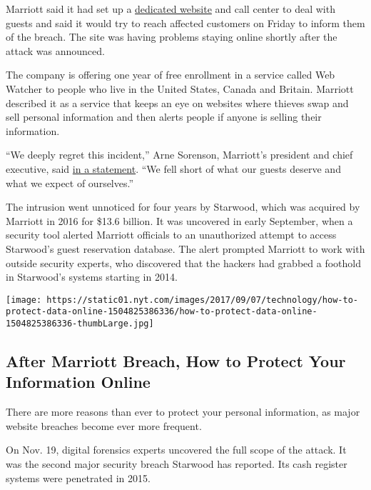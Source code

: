 Marriott said it had set up a
\href{https://info.starwoodhotels.com/}{dedicated website} and call
center to deal with guests and said it would try to reach affected
customers on Friday to inform them of the breach. The site was having
problems staying online shortly after the attack was announced.

The company is offering one year of free enrollment in a service called
Web Watcher to people who live in the United States, Canada and Britain.
Marriott described it as a service that keeps an eye on websites where
thieves swap and sell personal information and then alerts people if
anyone is selling their information.

``We deeply regret this incident,'' Arne Sorenson, Marriott's president
and chief executive, said
\href{http://news.marriott.com/2018/11/marriott-announces-starwood-guest-reservation-database-security-incident/}{in
a statement}. ``We fell short of what our guests deserve and what we
expect of ourselves.''

The intrusion went unnoticed for four years by Starwood, which was
acquired by Marriott in 2016 for \$13.6 billion. It was uncovered in
early September, when a security tool alerted Marriott officials to an
unauthorized attempt to access Starwood's guest reservation database.
The alert prompted Marriott to work with outside security experts, who
discovered that the hackers had grabbed a foothold in Starwood's systems
starting in 2014.

\href{https://www.nytimes.com/interactive/2017/technology/how-to-protect-data-online.html}{}

\texttt{[image: https://static01.nyt.com/images/2017/09/07/technology/how-to-protect-data-online-1504825386336/how-to-protect-data-online-1504825386336-thumbLarge.jpg]}

\hypertarget{after-marriott-breach-how-to-protect-your-information-online}{%
\subsection{After Marriott Breach, How to Protect Your Information
Online}\label{after-marriott-breach-how-to-protect-your-information-online}}

There are more reasons than ever to protect your personal information,
as major website breaches become ever more frequent.

On Nov. 19, digital forensics experts uncovered the full scope of the
attack. It was the second major security breach Starwood has reported.
Its cash register systems were penetrated in 2015.

